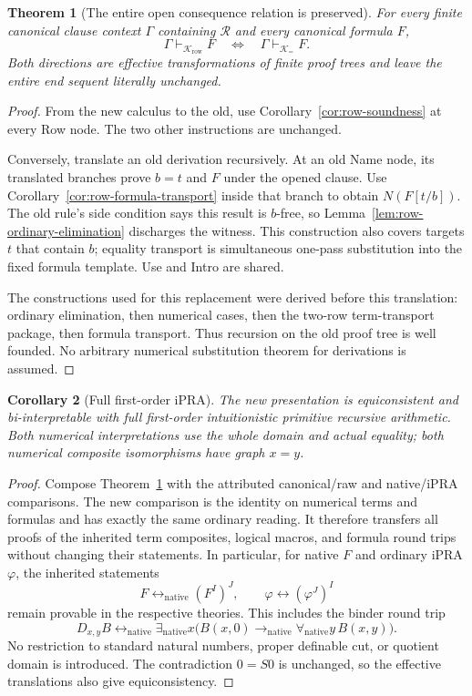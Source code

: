 \documentclass[11pt,letterpaper]{article}
\newtheorem{theorem}{Theorem}[section]
\newtheorem{corollary}[theorem]{Corollary}
\theoremstyle{definition}\newtheorem{definition}[theorem]{Definition}
\theoremstyle{remark}\newtheorem{remark}[theorem]{Remark}
\begin{document}
\begin{theorem}[The entire open consequence relation is preserved]
\label{thm:row-exact-equivalence}
For every finite canonical clause context $\Gamma$ containing
$\mathcal R$ and every canonical formula $F$,
\[
 \Gamma\vdash_{\mathcal K_{\mathrm{row}}}F
 \quad\Longleftrightarrow\quad
 \Gamma\vdash_{\mathcal K_{=}}F.
\]
Both directions are effective transformations of finite proof trees and
leave the entire end sequent literally unchanged.
\end{theorem}
\begin{proof}
From the new calculus to the old, use
Corollary~\ref{cor:row-soundness} at every Row node.  The two other
instructions are unchanged.

Conversely, translate an old derivation recursively.  At an old Name
node, its translated branches prove $b=t$ and $F$ under the opened
clause.  Use Corollary~\ref{cor:row-formula-transport} inside that branch
to obtain $N(F[t/b])$.  The old rule's side condition says this result is
$b$-free, so Lemma~\ref{lem:row-ordinary-elimination} discharges the
witness.  This construction also covers targets $t$ that contain $b$;
equality transport is simultaneous one-pass substitution into the fixed
formula template.  Use and Intro are shared.

The constructions used for this replacement were derived before this
translation: ordinary elimination, then numerical cases, then the
two-row term-transport package, then formula transport.  Thus recursion
on the old proof tree is well founded.  No arbitrary numerical
substitution theorem for derivations is assumed.
\end{proof}

\begin{corollary}[Full first-order iPRA]
\label{cor:row-ipra}
The new presentation is equiconsistent and bi-interpretable with full
first-order intuitionistic primitive recursive arithmetic.  Both
numerical interpretations use the whole domain and actual equality;
both numerical composite isomorphisms have graph $x=y$.
\end{corollary}
\begin{proof}
Compose Theorem~\ref{thm:row-exact-equivalence} with the attributed
canonical/raw and native/iPRA comparisons.  The new comparison is the
identity on numerical terms and formulas and has exactly the same
ordinary reading.  It therefore transfers all proofs of the inherited
term composites, logical macros, and formula round trips without
changing their statements.  In particular, for native $F$ and ordinary
iPRA $\varphi$, the inherited statements
\[
 F\leftrightarrow_{\mathrm{native}}(F^I)^J,
 \qquad
 \varphi\leftrightarrow(\varphi^J)^I
\]
remain provable in the respective theories.  This includes the binder
round trip
\[
 D_{x,y}B\leftrightarrow_{\mathrm{native}}
 \exists_{\mathrm{native}}x\bigl(
 B(x,0)\to_{\mathrm{native}}
 \forall_{\mathrm{native}}y\,B(x,y)\bigr).
\]
No restriction to standard natural numbers, proper definable cut, or
quotient domain is introduced.  The contradiction $0=S0$ is unchanged,
so the effective translations also give equiconsistency.
\end{proof}
\end{document}
